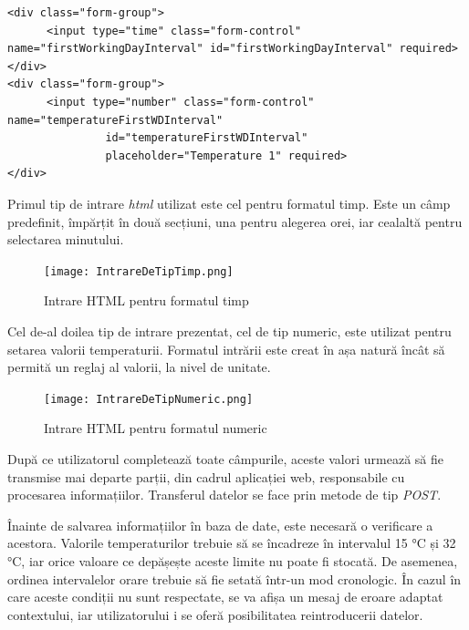 \vspace{1em}
\begin{lstlisting}
<div class="form-group">
      <input type="time" class="form-control" name="firstWorkingDayInterval" id="firstWorkingDayInterval" required>
</div>
<div class="form-group">
      <input type="number" class="form-control" name="temperatureFirstWDInterval"
               id="temperatureFirstWDInterval"
               placeholder="Temperature 1" required>
</div>
\end{lstlisting}
\vspace{1em} 

	Primul tip de intrare \textit{html} utilizat este cel pentru formatul timp. Este un câmp predefinit, împărțit în două secțiuni, una pentru alegerea orei, iar cealaltă pentru selectarea minutului.
	
\begin{figure}[H]
   	\centering
    	\texttt{[image: IntrareDeTipTimp.png]}
	\caption{Intrare HTML pentru formatul timp}
\end{figure}

	Cel de-al doilea tip de intrare prezentat, cel de tip numeric, este utilizat pentru setarea valorii temperaturii. Formatul intrării este creat în așa natură încât să permită un reglaj al valorii, la nivel de unitate.

\begin{figure}[H]
   	\centering
    	\texttt{[image: IntrareDeTipNumeric.png]}
	\caption{Intrare HTML pentru formatul numeric}
\end{figure}

	După ce utilizatorul completează toate câmpurile, aceste valori urmează să fie transmise mai departe parții, din cadrul aplicației web, responsabile cu procesarea informațiilor. Transferul datelor se face prin metode de tip \textit{POST}.

	Înainte de salvarea informațiilor în baza de date, este necesară o verificare a acestora. Valorile temperaturilor trebuie să se încadreze în intervalul 15 °C și 32 °C, iar orice valoare ce depășește aceste limite nu poate fi stocată. De asemenea, ordinea intervalelor orare trebuie să fie setată într-un mod cronologic. În cazul în care aceste condiții nu sunt respectate, se va afișa un mesaj de eroare adaptat contextului, iar utilizatorului i se oferă posibilitatea reintroducerii datelor.


